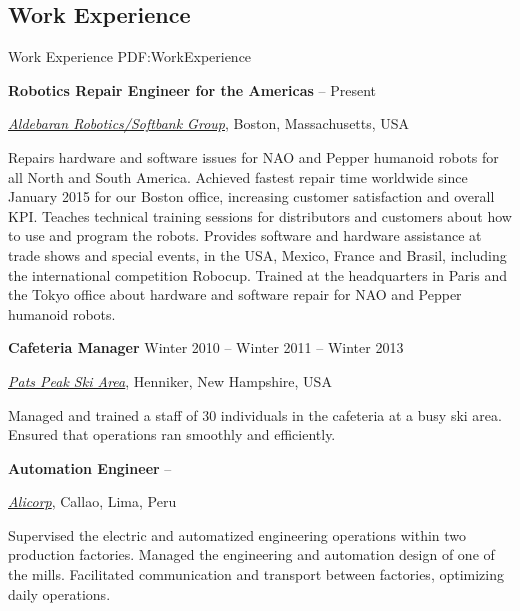 \documentclass[letterpaper,MMMyyyy,nonstop]{simpleresumecv}
\begin{document}
\begin{body}
\section
{Work Experience}
{Work Experience}
{PDF:WorkExperience}

\textbf{Robotics Repair Engineer for the Americas}
\hfill
{} --
Present 
\begin{detail}
\normalsize{ \href{https://www.aldebaran.com/en}
{\textit{Aldebaran Robotics/Softbank Group}},
Boston, Massachusetts, USA }
\end{detail}

\GapNoBreak
\BulletItem
Repairs hardware and software issues for NAO and Pepper humanoid robots for all North and South America. 
\BulletItem
Achieved fastest repair time worldwide since January 2015 for our Boston office, increasing customer satisfaction and overall KPI.
\BulletItem
Teaches technical training sessions for distributors and customers about how to use and program the robots.
\BulletItem
Provides software and hardware assistance at trade shows and special events, in the USA, Mexico, France and Brasil, including the international competition Robocup.
\BulletItem
Trained at the headquarters in Paris and the Tokyo office about hardware and software repair for NAO and Pepper humanoid robots.

\BigGap
\textbf{Cafeteria Manager}
\hfill
Winter 2010 --
Winter 2011 --
Winter 2013
\begin{detail}
\normalsize{ \href{http://www.patspeak.com/}
{\textit{Pats Peak Ski Area}},
Henniker, New Hampshire, USA }
\end{detail}

\GapNoBreak
\BulletItem
Managed and trained a staff of 30 individuals in the cafeteria at a busy ski area.
\BulletItem
Ensured that operations ran smoothly and efficiently.

\BigGap
\textbf{Automation Engineer}
\hfill
{} --
\begin{detail}
\normalsize{ \href{http://www.alicorp.com.pe/alicorp/index.html}
{\textit{Alicorp}},
Callao, Lima, Peru }
\end{detail}

\GapNoBreak
\BulletItem
Supervised the electric and automatized engineering operations within two production factories.
\BulletItem
Managed the engineering and automation design of one of the mills. Facilitated communication and transport between factories, optimizing daily operations.


\end{body}
\end{document}
